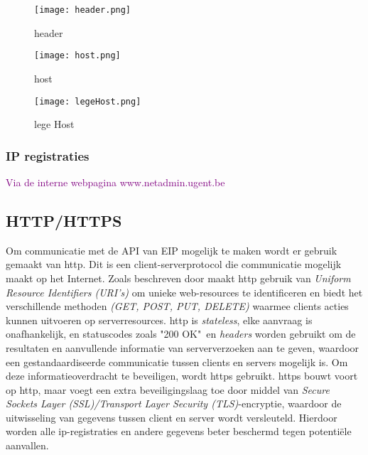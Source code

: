 \begin{figure}[h!]
    \texttt{[image: header.png]}
    \caption{header}
    \label{fig:header}
\end{figure}
\begin{figure}[h!]
    \texttt{[image: host.png]}
    \caption{host}
    \label{fig:host}
\end{figure}
\begin{figure}[h!]
    \texttt{[image: legeHost.png]}
    \caption{lege Host}
    \label{fig:legeHost}
\end{figure}

\subsubsection{IP registraties}
\textcolor{purple}{Via de interne webpagina www.netadmin.ugent.be 
}

\subsection{HTTP/HTTPS}
Om communicatie met de API van EIP mogelijk te maken wordt er gebruik gemaakt van \acrfull{http}. Dit is een client-serverprotocol die communicatie mogelijk maakt op het Internet. Zoals beschreven door \textcite{Fielding2014} maakt \acrshort{http} gebruik van \textit{Uniform Resource Identifiers (URI's)} om unieke web-resources te identificeren en biedt het verschillende methoden \textit{(GET, POST, PUT, DELETE)} waarmee clients acties kunnen uitvoeren op serverresources. \acrshort{http} is \textit{stateless}, elke aanvraag is onafhankelijk, en statuscodes zoals "200 OK"\ en \textit{headers} worden gebruikt om de resultaten en aanvullende informatie van serververzoeken aan te geven, waardoor een gestandaardiseerde communicatie tussen clients en servers mogelijk is.
Om deze informatieoverdracht te beveiligen, wordt \acrfull{https} gebruikt. \acrshort{https} bouwt voort op \acrshort{http}, maar voegt een extra beveiligingslaag toe door middel van \textit{Secure Sockets Layer (SSL)/Transport Layer Security (TLS)}-encryptie, waardoor de uitwisseling van gegevens tussen client en server wordt versleuteld. Hierdoor worden alle \acrshort{ip}-registraties en andere gegevens beter beschermd tegen potentiële aanvallen.
